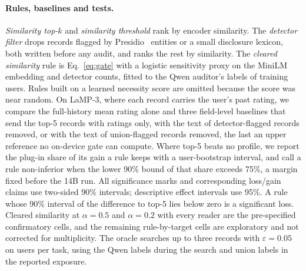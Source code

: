 \paragraph{Rules, baselines and tests.}
\emph{Similarity top-$k$} and \emph{similarity threshold} rank by encoder
similarity. The \emph{detector filter} drops records flagged by
Presidio~\cite{presidio2026software} entities or a small disclosure lexicon,
both written before any audit, and ranks the rest by similarity. The
\emph{cleared similarity} rule is Eq.~\eqref{eq:gate} with a logistic
sensitivity proxy on the MiniLM embedding and detector counts, fitted to the
Qwen auditor's labels of training users. Rules built on a learned necessity score are omitted because the score was
near random. On LaMP-3, where each record carries the user's past rating,
we compare the full-history mean rating alone and three field-level baselines that send the top-5 records with ratings
only, with the text of detector-flagged records removed, or with the text of
union-flagged records removed, the last an upper reference no on-device gate
can compute. Where top-5 beats no profile, we report the plug-in share of its
gain a rule keeps with a user-bootstrap interval, and call a rule
non-inferior when the lower 90\% bound of that share exceeds 75\%, a margin
fixed before the 14B run. All significance marks and corresponding loss/gain claims use two-sided 90\% intervals; descriptive effect intervals use 95\%. A rule whose 90\% interval of the difference to
top-5 lies below zero is a significant loss. Cleared similarity at
$\alpha=0.5$ and $\alpha=0.2$ with every reader are the pre-specified
confirmatory cells, and the remaining rule-by-target cells are exploratory
and not corrected for multiplicity. The oracle searches up to three records
with $\varepsilon=0.05$ on \threeOrN{} users per task, using the Qwen labels
during the search and union labels in the reported exposure.
